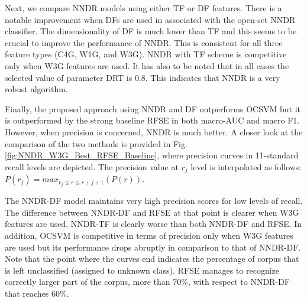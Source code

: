 Next, we compare NNDR models using either TF or DF features. There is a notable improvement when DFs are used in associated with the open-set NNDR classifier. The dimensionality of DF is much lower than TF and this seems to be crucial to improve the performance of NNDR. This is consistent for all three feature types (C4G, W1G, and W3G). NNDR with TF scheme is competitive only when W3G features are used. It has also to be noted that in all cases the selected value of parameter DRT is 0.8. This indicates that NNDR is a very robust algorithm.

Finally, the proposed approach using NNDR and DF outperforms OCSVM but it is outperformed by the strong baseline RFSE in both macro-AUC and macro F1. However, when precision is concerned, NNDR is much better. A closer look at  the comparison of the two methods is provided in Fig. \ref{fig:NNDR_W3G_Best_RFSE_Baseline}, where precision curves in 11-standard recall levels are depicted. The precision value at $r_j$ level is interpolated as follows: $P(r_j)=max_{r_j \leq r \leq r+{j+1}}(P(r))$.

The NNDR-DF model maintains very high precision scores for low levels of recall. The difference between NNDR-DF and RFSE at that point is clearer when W3G features are used. NNDR-TF is clearly worse than both NNDR-DF and RFSE. In addition, OCSVM is competitive in terms of precision only when W3G features are used but its performance drops abruptly in comparison to that of NNDR-DF. Note that the point where the curves end indicates the percentage of corpus that is left unclassified (assigned to unknown class). RFSE manages to recognize correctly larger part of the corpus, more than $70\%$, with respect to NNDR-DF that reaches $60\%$. 

